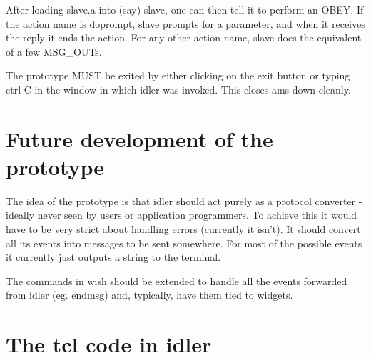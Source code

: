 After loading slave.a into (say) slave, one can then tell it to perform
an OBEY. If the action name is doprompt, slave prompts for a parameter, and
when it receives the reply it ends the action. For any other action name,
slave does the equivalent of a few MSG\_OUTs.

The prototype MUST be exited by either clicking on the exit button or
typing ctrl-C in the window in which idler was invoked. This closes ams
down cleanly.


\section {Future development of the prototype}

The idea of the prototype is that idler should act purely as a protocol
converter - ideally never seen by users or application programmers. To
achieve this it would have to be very strict about handling errors
(currently it isn't). It should convert all its events into messages to
be sent somewhere. For most of the possible events it currently just
outputs a string to the terminal.

The commands in wish should be extended to handle all the events
forwarded from idler (eg. endmsg) and, typically, have them tied to
widgets.


\section {The tcl code in idler}


